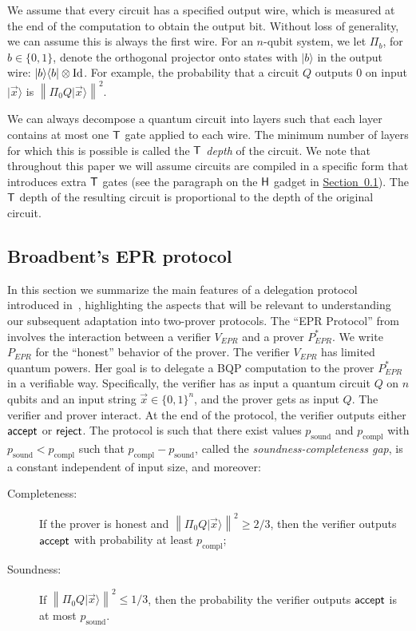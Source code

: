 \documentclass[11pt]{article}
\numberwithin{equation}{section}
\theoremstyle{definition}
\theoremstyle{plain}
\newcommand{\expref}[2]{\hyperref[#2]{#1~\ref{#2}}}
\newcommand{\ket}[1]{|#1\rangle}
\newcommand{\bra}[1]{\langle#1|}
\newcommand{\Id}{\ensuremath{\mathop{\rm Id}\nolimits}}
\DeclareMathOperator{\sound}{sound}
\DeclareMathOperator{\compl}{compl}
\newcommand{\norm}[1]{\left\|#1\right\|}
\begin{document}
We assume that every circuit has a specified output wire, which is measured at the end of the computation to obtain the output bit. Without loss of generality, we can assume this is always the first wire. For an $n$-qubit system, we let $\Pi_b$, for $b \in \{0,1\}$, denote the orthogonal projector onto states with $\ket{b}$ in the output wire: $\ket{b}\bra{b}\otimes \Id$. For example, the probability that a circuit $Q$ outputs 0 on input $\ket{\vec{x}}$ is $\norm{\Pi_0 Q\ket{\vec{x}}}^2$. 

We can always decompose a quantum circuit into layers such that each layer contains at most one $\sf T$ gate applied to each wire. The minimum number of layers for which this is possible is called the \emph{$\sf T$ depth} of the circuit. 
We note that throughout this %
paper  %
we will assume circuits are compiled in a specific form that introduces extra $\sf T$ gates (see the paragraph on the $\sf H$ gadget in \expref{Section}{sec:EPR-protocol}). The $\sf T$ depth of the resulting circuit is proportional to the depth of the original circuit. 



\subsection{Broadbent's EPR protocol}  %
\label{sec:EPR-protocol}


In this section we summarize the main features of a delegation protocol introduced in~\cite{broadbent15howtoverify}, highlighting the aspects that will be relevant to understanding our subsequent adaptation into two-prover protocols. The ``EPR Protocol'' from \cite{broadbent15howtoverify} involves the interaction between a verifier $V_{EPR}$ and a prover $P_{EPR}^*$. We write $P_{EPR}$ for the ``honest'' behavior of the prover. The verifier $V_{EPR}$ has limited quantum powers. Her goal is to delegate a BQP computation to the prover $P_{EPR}^*$ in a verifiable way. Specifically, the verifier has as input a quantum circuit $Q$ on $n$ qubits and an input string $\vec{x}\in\{0,1\}^n$, and the prover gets as input $Q$. The verifier and prover interact. At the end of the protocol, the verifier outputs either $\sf accept$ or $\sf reject$. The protocol is such that there exist values $p_{\sound}$ and $p_{\compl}$ with $p_{\sound}< p_{\compl}$ such that $p_{\compl}-p_{\sound}$, called the \emph{soundness-completeness gap}, is a constant independent of input size, and moreover:

\begin{description}
\item[Completeness:] If the prover is honest and $\norm{\Pi_0Q\ket{\vec{x}}}^2 \geq 2/3$, then the verifier outputs $\sf accept$ with probability at least $p_{\compl}$;  
\item[Soundness:] If $\norm{\Pi_0Q\ket{\vec{x}}}^2 \leq 1/3$, then the probability the verifier outputs $\sf accept$ is at most $p_{\sound}$.
\end{description}
\end{document}
